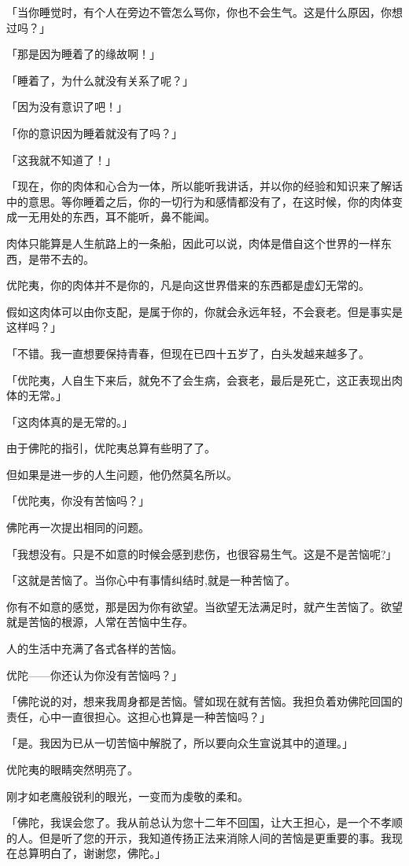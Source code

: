 \documentclass[twoside,openany]{book}
\begin{document}
「当你睡觉时，有个人在旁边不管怎么骂你，你也不会生气。这是什么原因，你想过吗？」

「那是因为睡着了的缘故啊！」

「睡着了，为什么就没有关系了呢？」

「因为没有意识了吧！」

「你的意识因为睡着就没有了吗？」

「这我就不知道了！」

「现在，你的肉体和心合为一体，所以能听我讲话，并以你的经验和知识来了解话中的意思。等你睡着之后，你的一切行为和感情都没有了，在这时候，你的肉体变成一无用处的东西，耳不能听，鼻不能闻。

肉体只能算是人生航路上的一条船，因此可以说，肉体是借自这个世界的一样东西，是带不去的。

优陀夷，你的肉体并不是你的，凡是向这世界借来的东西都是虚幻无常的。

假如这肉体可以由你支配，是属于你的，你就会永远年轻，不会衰老。但是事实是这样吗？」

「不错。我一直想要保持青春，但现在已四十五岁了，白头发越来越多了。

「优陀夷，人自生下来后，就免不了会生病，会衰老，最后是死亡，这正表现出肉体的无常。」

「这肉体真的是无常的。」

由于佛陀的指引，优陀夷总算有些明了了。

但如果是进一步的人生问题，他仍然莫名所以。

「优陀夷，你没有苦恼吗？」

佛陀再一次提出相同的问题。

「我想没有。只是不如意的时候会感到悲伤，也很容易生气。这是不是苦恼呢?」

「这就是苦恼了。当你心中有事情纠结时,就是一种苦恼了。

你有不如意的感觉，那是因为你有欲望。当欲望无法满足时，就产生苦恼了。欲望就是苦恼的根源，人常在苦恼中生存。

人的生活中充满了各式各样的苦恼。

优陀——你还认为你没有苦恼吗？」

「佛陀说的对，想来我周身都是苦恼。譬如现在就有苦恼。我担负着劝佛陀回国的责任，心中一直很担心。这担心也算是一种苦恼吗？」

「是。我因为已从一切苦恼中解脱了，所以要向众生宣说其中的道理。」

优陀夷的眼睛突然明亮了。

刚才如老鹰般锐利的眼光，一变而为虔敬的柔和。

「佛陀，我误会您了。我从前总认为您十二年不回国，让大王担心，是一个不孝顺的人。但是听了您的开示，我知道传扬正法来消除人间的苦恼是更重要的事。我现在总算明白了，谢谢您，佛陀。」
\end{document}
